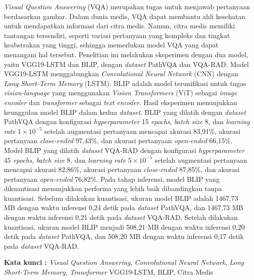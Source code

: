 \begin{abstractind}

\textit{Visual Question Answering} (VQA) merupakan tugas untuk menjawab pertanyaan berdasarkan gambar. Dalam dunia medis, VQA dapat membantu ahli kesehatan untuk mendapatkan informasi dari citra medis. Namun, citra medis memiliki tantangan tersendiri, seperti variasi pertanyaan yang kompleks dan tingkat keabstrakan yang tinggi, sehingga memerlukan model VQA yang dapat menangani hal tersebut. Penelitian ini melakukan eksperimen dengan dua model, yaitu VGG19-LSTM dan BLIP, dengan \textit{dataset} PathVQA dan VQA-RAD. Model VGG19-LSTM menggabungkan \textit{Convolutional Neural Network} (CNN) dengan \textit{Long Short-Term Memory} (LSTM). BLIP adalah model terunifikasi untuk tugas \textit{vision-language} yang menggunakan \textit{Vision Transformers} (ViT) sebagai \textit{image encoder} dan \textit{transformer} sebagai \textit{text encoder}. Hasil eksperimen menunjukkan keunggulan model BLIP dalam kedua \textit{dataset}. BLIP yang dilatih dengan \textit{dataset} PathVQA dengan konfigurasi \textit{hyperparameter} 15 \textit{epochs}, \textit{batch size} 8, dan \textit{learning rate} $1 \times 10^{-5}$ setelah augmentasi pertanyaan mencapai akurasi 83,91\%, akurasi pertanyaan \textit{close-ended} 97,43\%, dan akurasi pertanyaan \textit{open-ended} 66,15\%. Model BLIP yang dilatih \textit{dataset} VQA-RAD dengan konfigurasi \textit{hyperparameter} 45 \textit{epochs}, \textit{batch size} 8, dan \textit{learning rate} $5 \times 10^{-5}$ setelah augmentasi pertanyaan mencapai akurasi 82,86\%, akurasi pertanyaan \textit{close-ended} 87,85\%, dan akurasi pertanyaan \textit{open-ended} 76,82\%. Pada tahap inferensi, model BLIP yang dikuantisasi menunjukkan performa yang lebih baik dibandingkan tanpa kuantisasi. Sebelum dilakukan kuantisasi, ukuran model BLIP adalah 1467,73 MB dengan waktu inferensi 0,24 detik pada \textit{dataset} PathVQA, dan 1467,73 MB dengan waktu inferensi 0,21 detik pada \textit{dataset} VQA-RAD. Setelah dilakukan kuantisasi, ukuran model BLIP menjadi 508,21 MB dengan waktu inferensi 0,20 detik pada \textit{dataset} PathVQA, dan 508,20 MB dengan waktu inferensi 0,17 detik pada \textit{dataset} VQA-RAD.




\bigskip
\noindent
\textbf{Kata kunci :} \textit{Visual Question Answering}, \textit{Convolutional Neural Network}, \textit{Long Short-Term Memory}, \textit{Transformer} VGG19-LSTM, BLIP, Citra Medis
\end{abstractind}